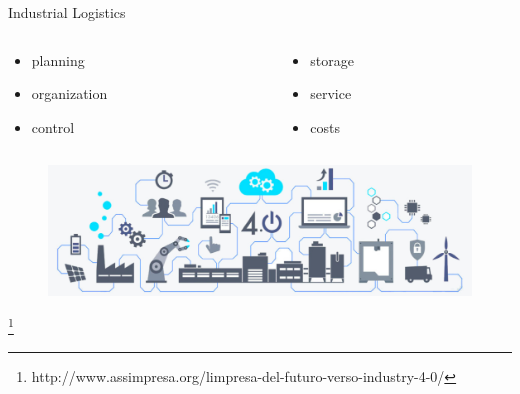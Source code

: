 
    \begin{frame}[fragile]{Industrial Logistics}
        \begin{columns}
            \begin{column}{.25\textwidth}
                \begin{itemize}
                \item  planning
                \item  organization
                \item  control
                \end{itemize} 
            \end{column}
            \begin{column}{.25\textwidth}
                \begin{itemize}
                    \item storage
                    \item service
                    \item costs
                \end{itemize}
            \end{column}
        \end{columns}
        \addvspace{0.6cm}
        \begin{figure}[hbt]
            \centering
            \includegraphics[width=\textwidth]{img/ind4.png}
        \end{figure}
        {\let\thefootnote\relax\footnote{{http://www.assimpresa.org/limpresa-del-futuro-verso-industry-4-0/}}}  
    \end{frame}


